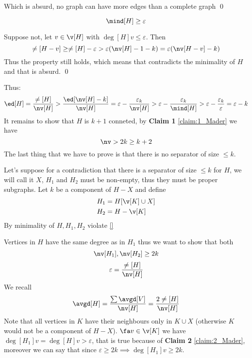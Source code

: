 \begin{prf}
\begin{prf}
        Which is absurd, no graph can have more edges than a complete graph \qed
    \end{prf}
    \begin{claim}
        \label{claim:2_Mader}
        \begin{equation*}
            \mind[H] \geq \varepsilon
        \end{equation*}
    \end{claim}
    \begin{prf}
        Suppose not, let $v \in \v[H]$ with $\deg[H]{v} \leq \varepsilon$. Then 
        \begin{equation*}
            \ne[H - v] \geq \ne[H] - \varepsilon > \varepsilon(\nv[H] - 1 - k) = \varepsilon(\nv[H - v] - k)
        \end{equation*}
        Thus the property still holds, which means that contradicts the minimality of $H$ and that is absurd. \qed
    \end{prf}
    Thus:
    \begin{equation*}
        \ed[H] = \frac{\ne[H]}{\nv[H]} > \frac{\ed[\nv[H] - k]}{\nv[H]} = \varepsilon - \frac{\varepsilon_k}{\nv[H]} > \varepsilon - \frac{\varepsilon_k}{\mind[H]} > \varepsilon - \frac{\varepsilon_k}{\varepsilon} = \varepsilon - k
    \end{equation*}
    It remains to show that $H$ is $k + 1$ conneted, by \textbf{Claim 1} \ref{claim:1_Mader} we have
    \begin{equation*}
        \nv > 2k \geq k + 2
    \end{equation*}
    The last thing that we have to prove is that there is no separator of size $\leq k$.

    Let's suppose for a contradiction that there is a separator of size $\leq k$ for $H$, we will call it $X$, $H_1$ and $H_2$ must be non-empty, thus they must be proper subgraphs. Let $k$ be a component of $H - X$ and define
    \begin{align*}
        H_1 &= H[\v[K] \cup X]\\
        H_2 &= H - \v[K]
    \end{align*}
    By minimality of $H, H_1, H_2$ violate \ref{}

    Vertices in $H$ have the same degree as in $H_1$ thus we want to show that both
    \begin{equation*}
        \nv[H_1], \nv[H_2] \geq 2k
    \end{equation*}
    \begin{equation*}
        \varepsilon = \frac{\ne[H]}{\nv[H]}
    \end{equation*}
    We recall
    \begin{equation*}
        \avgd[H] = \frac{\sum\avgd[V]}{\nv[H]} = \frac{2\ne[H]}{\nv[H]}
    \end{equation*}
    Note that all vertices in $K$ have their neighbours only in $K \cup X$ (otherwise $K$ would not be a component of $H - X$). $\fa v \in \v[K]$ we have $\deg[H_1]{v} = \deg[H]{v} > \varepsilon$, that is true because of \textbf{Claim 2} \ref{claim:2_Mader}, moreover we can say that since $\varepsilon \geq 2k \implies \deg[H_1]{v} \geq 2k$.
    

\end{prf}
